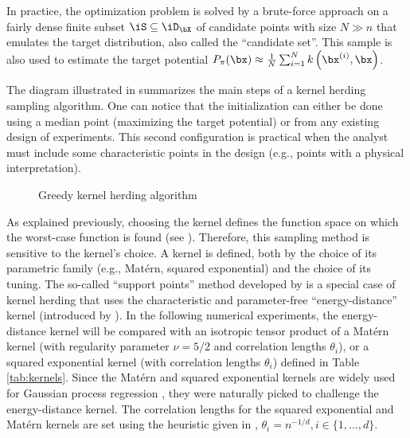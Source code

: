 \begin{remark}
In practice, the optimization problem is solved by a brute-force approach on a fairly dense finite subset $\iS\subseteq\iD_{\bX}$ of candidate points with size $N \gg n$ that emulates the target distribution, also called the ``candidate set''. 
This sample is also used to estimate the target potential $P_\pi(\bx) \approx \frac1N \sum_{i=1}^N k\left(\bx^{(i)}, \bx\right)$.
\end{remark}
\medskip

The diagram illustrated in  summarizes the main steps of a kernel herding sampling algorithm. 
One can notice that the initialization can either be done using a median point (maximizing the target potential) or from any existing design of experiments. 
This second configuration is practical when the analyst must include some characteristic points in the design (e.g., points with a physical interpretation). 

\begin{figure}
    \centering
    
    \caption{Greedy kernel herding algorithm}
    \label{fig:kh_algo}
\end{figure}

As explained previously, choosing the kernel defines the function space on which the worst-case function is found (see ). 
Therefore, this sampling method is sensitive to the kernel's choice. 
A kernel is defined, both by the choice of its parametric family (e.g., Matérn, squared exponential) and the choice of its tuning. 
The so-called ``support points'' method developed by \cite{mak_joseph_2018} is a special case of kernel herding that uses the characteristic and parameter-free ``energy-distance'' kernel (introduced by \citealp{szekely_rizzo_2013}). 
In the following numerical experiments, the energy-distance kernel will be compared with an isotropic tensor product of a Matérn kernel (with regularity parameter $\nu = 5/2$ and correlation lengths $\theta_i$), or a squared exponential kernel (with correlation lengths $\theta_i$) defined in Table \ref{tab:kernels}. 
Since the Matérn and squared exponential kernels are widely used for Gaussian process regression \citep{rasmussen_2006}, they were naturally picked to challenge the energy-distance kernel. 
The correlation lengths for the squared exponential and Matérn kernels are set using the heuristic given in \cite{fekhari_iooss_2023}, $\theta_i = n^{-1/d}, i \in \{1, \dots, d\}$. 

